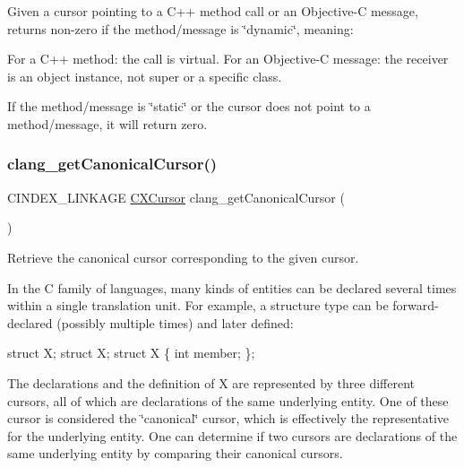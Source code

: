 Given a cursor pointing to a C++ method call or an Objective-\/C message, returns non-\/zero if the method/message is \char`\"{}dynamic\char`\"{}, meaning\+: 

For a C++ method\+: the call is virtual. For an Objective-\/C message\+: the receiver is an object instance, not \textquotesingle{}super\textquotesingle{} or a specific class.

If the method/message is \char`\"{}static\char`\"{} or the cursor does not point to a method/message, it will return zero. \mbox{\label{group__CINDEX__CURSOR__XREF_gac802826668be9fd40a017523cc7d24fe}} 
\subsubsection{\texorpdfstring{clang\+\_\+get\+Canonical\+Cursor()}{clang\_getCanonicalCursor()}}
{\footnotesize\ttfamily C\+I\+N\+D\+E\+X\+\_\+\+L\+I\+N\+K\+A\+GE \hyperlink{structCXCursor}{C\+X\+Cursor} clang\+\_\+get\+Canonical\+Cursor (\begin{DoxyParamCaption}\item[{\hyperlink{structCXCursor}{C\+X\+Cursor}}]{ }\end{DoxyParamCaption})}



Retrieve the canonical cursor corresponding to the given cursor. 

In the C family of languages, many kinds of entities can be declared several times within a single translation unit. For example, a structure type can be forward-\/declared (possibly multiple times) and later defined\+:


\begin{DoxyCode}
\textcolor{keyword}{struct }X;
\textcolor{keyword}{struct }X;
\textcolor{keyword}{struct }X \{
  \textcolor{keywordtype}{int} member;
\};
\end{DoxyCode}


The declarations and the definition of {\ttfamily X} are represented by three different cursors, all of which are declarations of the same underlying entity. One of these cursor is considered the \char`\"{}canonical\char`\"{} cursor, which is effectively the representative for the underlying entity. One can determine if two cursors are declarations of the same underlying entity by comparing their canonical cursors.

